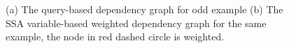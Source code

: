 \begin{figure}
\begin{subfigure}{0.5\textwidth}
\begin{centering}
\begin{tikzpicture}[scale=\textwidth/16cm,samples=200]
          \end{tikzpicture}
              \caption{}
              \end{centering}
              \end{subfigure}
              \vspace{-0.3cm}
              \caption{(a) The query-based dependency graph for odd example (b) The SSA variable-based weighted dependency graph for the same example, the node in red dashed circle is weighted.}
              \label{fig:odd_graphs}
              \vspace{-0.3cm}
          \end{figure}